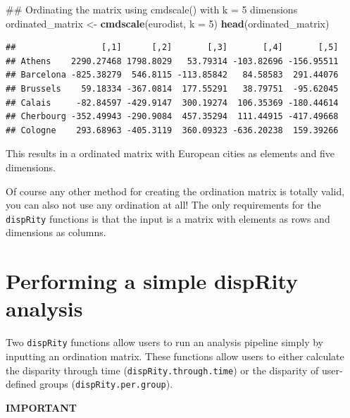 \documentclass[]{book}
\newenvironment{Shaded}{\begin{snugshade}}{\end{snugshade}}
\newcommand{\KeywordTok}[1]{\textcolor[rgb]{0.13,0.29,0.53}{\textbf{#1}}}
\newcommand{\DataTypeTok}[1]{\textcolor[rgb]{0.13,0.29,0.53}{#1}}
\newcommand{\DecValTok}[1]{\textcolor[rgb]{0.00,0.00,0.81}{#1}}
\newcommand{\StringTok}[1]{\textcolor[rgb]{0.31,0.60,0.02}{#1}}
\newcommand{\NormalTok}[1]{#1}
\theoremstyle{definition}
\theoremstyle{definition}
\theoremstyle{definition}
\theoremstyle{remark}
\begin{document}
\begin{Shaded}
\begin{Highlighting}[]
\NormalTok{## Ordinating the matrix using cmdscale() with k = 5 dimensions }
\NormalTok{ordinated_matrix <-}\StringTok{ }\KeywordTok{cmdscale}\NormalTok{(eurodist, }\DataTypeTok{k =} \DecValTok{5}\NormalTok{)}
\KeywordTok{head}\NormalTok{(ordinated_matrix)}
\end{Highlighting}
\end{Shaded}

\begin{verbatim}
##                 [,1]      [,2]       [,3]       [,4]       [,5]
## Athens    2290.27468 1798.8029   53.79314 -103.82696 -156.95511
## Barcelona -825.38279  546.8115 -113.85842   84.58583  291.44076
## Brussels    59.18334 -367.0814  177.55291   38.79751  -95.62045
## Calais     -82.84597 -429.9147  300.19274  106.35369 -180.44614
## Cherbourg -352.49943 -290.9084  457.35294  111.44915 -417.49668
## Cologne    293.68963 -405.3119  360.09323 -636.20238  159.39266
\end{verbatim}

This results in a ordinated matrix with European cities as elements and
five dimensions.

Of course any other method for creating the ordination matrix is totally
valid, you can also not use any ordination at all! The only requirements
for the \texttt{dispRity} functions is that the input is a matrix with
elements as rows and dimensions as columns.

\section{Performing a simple dispRity analysis}\label{simpleanalysis}

Two \texttt{dispRity} functions allow users to run an analysis pipeline
simply by inputting an ordination matrix. These functions allow users to
either calculate the disparity through time
(\texttt{dispRity.through.time}) or the disparity of user-defined groups
(\texttt{dispRity.per.group}).

\textbf{IMPORTANT}
\end{document}
